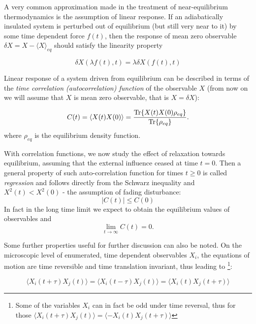 \documentclass[a4paper,12pt]{article}
\begin{document}
A very common approximation made in the treatment of near-equilibrium thermodynamics is the assumption of linear response. If an adiabatically insulated system is perturbed out of equilibrium (but still very near to it) by some time dependent force $f(t)$, then the response of mean zero observable $\delta X= X-\langle X \rangle_{eq}$  should satisfy the linearity property

\begin{equation}
\label{LiearityProperty}
  \delta X(\lambda f(t),t) = \lambda \delta X(f(t),t)
\end{equation}

Linear response of a system driven from equilibrium can be described in terms of the \textit{time correlation (autocorrelation) function} of the observable $X$ (from now on we will assume that $X$ is mean zero observable, that is $X=\delta X$):
 
\begin{equation}
  C(t)=\langle X(t)X(0) \rangle = \frac{\Tr{X(t)X(0)\rho_{eq}}}{\Tr{\rho_{eq}}}.
\end{equation}
where $\rho_{eq}$ is the equilibrium density function.

With correlation functions, we now study the effect of relaxation towards equilibrium, assuming that the external influence ceased at time $t=0$.
Then a general property of such auto-correlation function for times $t\geq 0$ is called \textit{regression} and follows directly from the Schwarz inequality and $X^2(t)<X^2(0)$ - the assumption of fading disturbance:
\begin{equation}
 | C(t) | \leq C(0)
\end{equation}
In fact in the long time limit we expect to obtain the equilibrium values of observables and
\begin{equation}
  \lim_{t \to \infty} C(t)=0.
\end{equation}

Some further properties useful for further discussion can also be noted.
On the microscopic level of enumerated, time dependent observables $X_i$, the equations of motion are time reversible and time translation invariant\cite{Anonymous:vN0-ttAB}, thus leading to
\footnote{Some of the variables $X_i$ can in fact be odd under time reversal, thus for those $\langle X_i(t+\tau) X_j(t) \rangle = \langle -X_i(t) X_j(t+\tau) \rangle$}:

\begin{equation}
  \langle X_i(t+\tau) X_j(t) \rangle =   \langle X_i(t-\tau) X_j(t) \rangle =  \langle X_i(t) X_j(t+\tau) \rangle
\end{equation}
\end{document}
